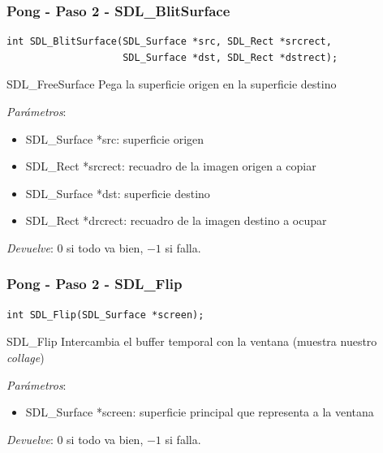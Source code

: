 \begin{frame}[fragile]
    \frametitle{Pong - Paso 2 - SDL\_BlitSurface}
	
\begin{verbatim}
int SDL_BlitSurface(SDL_Surface *src, SDL_Rect *srcrect,
                    SDL_Surface *dst, SDL_Rect *dstrect);
\end{verbatim}

    \begin{block}{SDL\_FreeSurface}
	Pega la superficie origen en la superficie destino
	
	\emph{Parámetros}:
	\begin{itemize}
	    \item SDL\_Surface *src: superficie origen
	    \item SDL\_Rect *srcrect: recuadro de la imagen origen a copiar
	    \item SDL\_Surface *dst: superficie destino
	    \item SDL\_Rect *drcrect: recuadro de la imagen destino a ocupar
	\end{itemize}
	
	\emph{Devuelve}: $0$ si todo va bien, $-1$ si falla.
    \end{block}

\end{frame}

\begin{frame}[fragile]
    \frametitle{Pong - Paso 2 - SDL\_Flip}
	
\begin{verbatim}
int SDL_Flip(SDL_Surface *screen);
\end{verbatim}

    \begin{block}{SDL\_Flip}
	Intercambia el buffer temporal con la ventana (muestra nuestro \emph{collage})
	
	\emph{Parámetros}:
	\begin{itemize}
	    \item SDL\_Surface *screen: superficie principal que representa a la ventana
	\end{itemize}
	
	\emph{Devuelve}: $0$ si todo va bien, $-1$ si falla.
    \end{block}

\end{frame}

